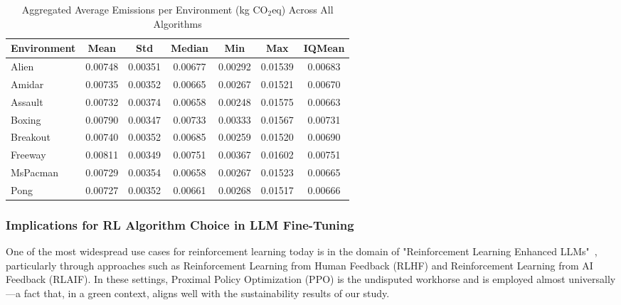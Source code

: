 \begin{table}
	\centering
	\caption{Aggregated Average Emissions per Environment (kg CO$_2$eq) Across All Algorithms}
	\label{tab:env_emissions}
	\begin{tabular}{lcccccc}
		\toprule
		\textbf{Environment} & \textbf{Mean} & \textbf{Std} & \textbf{Median} & \textbf{Min} & \textbf{Max} & \textbf{IQMean} \\
		\midrule
		Alien    & 0.00748 & 0.00351 & 0.00677 & 0.00292 & 0.01539 & 0.00683 \\
		Amidar   & 0.00735 & 0.00352 & 0.00665 & 0.00267 & 0.01521 & 0.00670 \\
		Assault  & 0.00732 & 0.00374 & 0.00658 & 0.00248 & 0.01575 & 0.00663 \\
		Boxing   & 0.00790 & 0.00347 & 0.00733 & 0.00333 & 0.01567 & 0.00731 \\
		Breakout & 0.00740 & 0.00352 & 0.00685 & 0.00259 & 0.01520 & 0.00690 \\
		Freeway  & 0.00811 & 0.00349 & 0.00751 & 0.00367 & 0.01602 & 0.00751 \\
		MsPacman & 0.00729 & 0.00354 & 0.00658 & 0.00267 & 0.01523 & 0.00665 \\
		Pong     & 0.00727 & 0.00352 & 0.00661 & 0.00268 & 0.01517 & 0.00666 \\
		\bottomrule
	\end{tabular}
\end{table}

\subsubsection{Implications for RL Algorithm Choice in LLM Fine-Tuning}
\label{subsubsec:rlhf}
One of the most widespread use cases for reinforcement learning today is in the domain of 
"Reinforcement Learning Enhanced LLMs"~\cite{wang:rl_enhanced_llm}, particularly through approaches 
such as Reinforcement Learning from Human Feedback (RLHF) and Reinforcement Learning from AI Feedback (RLAIF). 
In these settings, Proximal Policy Optimization (PPO) is the undisputed workhorse and is employed almost 
universally—a fact that, in a green context, aligns well with the sustainability results of our study.

